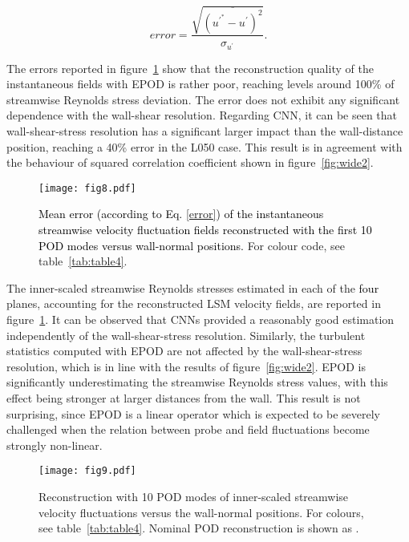 \begin{equation}
   error=\frac{\sqrt{\overline{(u^{\prime^*}-u^{\prime})^2}}}{\sigma_{u^{\prime}}}.
   \label{error}
\end{equation}{}

The errors reported in figure~\ref{fig:uu_epod} show that the reconstruction quality of the instantaneous fields with EPOD is rather poor, reaching levels around 100\% of streamwise Reynolds stress deviation.
The error does not exhibit any significant dependence with the wall-shear resolution.
Regarding CNN, it can be seen that wall-shear-stress resolution has a significant larger impact than the wall-distance position, reaching a 40\% error in the L050 case.
This result is in agreement with the behaviour of squared correlation coefficient shown in figure~\ref{fig:wide2}.

\begin{figure}
\texttt{[image: fig8.pdf]}%
\caption{\label{fig:uu_epod}\textcolor{black}{Mean error (according to Eq. \ref{error}) of the instantaneous streamwise velocity fluctuation fields reconstructed with the first 10 POD modes versus wall-normal positions.} For colour code, see table~\ref{tab:table4}.}
\end{figure}

The inner-scaled streamwise Reynolds stresses estimated in each of the \textcolor{black}{four} planes, accounting for the reconstructed LSM velocity fields, are reported in figure~\ref{fig:uu_epod}.
It can be observed that CNNs provided a reasonably good estimation independently of the wall-shear-stress resolution.
Similarly, the turbulent statistics computed with EPOD are not affected by the wall-shear-stress resolution, which is in line with the results of figure~\ref{fig:wide2}.
EPOD is significantly underestimating the streamwise Reynolds stress values, with this effect being stronger at larger distances from the wall.
This result is not surprising, since EPOD is a linear operator which is expected to be severely challenged when the relation between probe and field fluctuations become strongly non-linear.

\begin{figure}
\texttt{[image: fig9.pdf]}%
\caption{\label{fig:uu_cnn}Reconstruction with 10 POD modes of inner-scaled streamwise velocity fluctuations versus the wall-normal positions. For colours, see table~\ref{tab:table4}. Nominal POD reconstruction is shown as .}
\end{figure}

